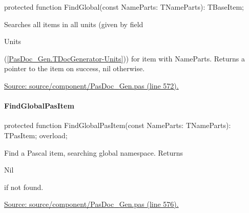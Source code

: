 \documentclass{report}
\newif\ifpdf
\begin{document}
\label{PasDoc_Gen.TDocGenerator-FindGlobal}
\begin{list}{}{
\setlength{\itemindent}{0cm}
\setlength{\listparindent}{0cm}
\setlength{\leftmargin}{\evensidemargin}
\addtolength{\leftmargin}{\tmplength}
\settowidth{\labelsep}{X}
\addtolength{\leftmargin}{\labelsep}
\setlength{\labelwidth}{\tmplength}
}
\item[\textbf{Declaration}\hfill]
\ifpdf
\begin{flushleft}
\fi
\begin{ttfamily}
protected function FindGlobal(const NameParts: TNameParts): TBaseItem;\end{ttfamily}

\ifpdf
\end{flushleft}
\fi

\par
\item[\textbf{Description}]
Searches all items in all units (given by field \begin{ttfamily}Units\end{ttfamily}(\ref{PasDoc_Gen.TDocGenerator-Units})) for item with NameParts. Returns a pointer to the item on success, nil otherwise.\par
\href{https://github.com/pasdoc/pasdoc/blob/master/source/component/PasDoc_Gen.pas#L572}{Source: source/component/PasDoc{\_}Gen.pas (line 572).}

\end{list}
\paragraph*{FindGlobalPasItem}\hspace*{\fill}

\label{PasDoc_Gen.TDocGenerator-FindGlobalPasItem}
\begin{list}{}{
\setlength{\itemindent}{0cm}
\setlength{\listparindent}{0cm}
\setlength{\leftmargin}{\evensidemargin}
\addtolength{\leftmargin}{\tmplength}
\settowidth{\labelsep}{X}
\addtolength{\leftmargin}{\labelsep}
\setlength{\labelwidth}{\tmplength}
}
\item[\textbf{Declaration}\hfill]
\ifpdf
\begin{flushleft}
\fi
\begin{ttfamily}
protected function FindGlobalPasItem(const NameParts: TNameParts): TPasItem; overload;\end{ttfamily}

\ifpdf
\end{flushleft}
\fi

\par
\item[\textbf{Description}]
Find a Pascal item, searching global namespace. Returns \begin{ttfamily}Nil\end{ttfamily} if not found.\par
\href{https://github.com/pasdoc/pasdoc/blob/master/source/component/PasDoc_Gen.pas#L576}{Source: source/component/PasDoc{\_}Gen.pas (line 576).}

\end{list}
\end{document}

